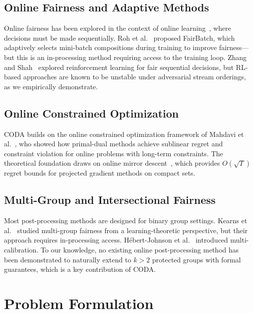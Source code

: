 \documentclass[10pt,twocolumn]{article}
\theoremstyle{definition}
\begin{document}
\subsection{Online Fairness and Adaptive Methods}
Online fairness has been explored in the context of online learning~\cite{gillen2018online,blum2018preserving}, where decisions must be made sequentially. Roh et al.~\cite{roh2021fairbatch} proposed FairBatch, which adaptively selects mini-batch compositions during training to improve fairness---but this is an in-processing method requiring access to the training loop. Zhang and Shah~\cite{zhang2020fairness} explored reinforcement learning for fair sequential decisions, but RL-based approaches are known to be unstable under adversarial stream orderings, as we empirically demonstrate.

\subsection{Online Constrained Optimization}
CODA builds on the online constrained optimization framework of Mahdavi et al.~\cite{mahdavi2012trading}, who showed how primal-dual methods achieve sublinear regret and constraint violation for online problems with long-term constraints. The theoretical foundation draws on online mirror descent~\cite{hazan2016introduction,shalev2012online}, which provides $O(\sqrt{T})$ regret bounds for projected gradient methods on compact sets.

\subsection{Multi-Group and Intersectional Fairness}
Most post-processing methods are designed for binary group settings. Kearns et al.~\cite{kearns2018preventing} studied multi-group fairness from a learning-theoretic perspective, but their approach requires in-processing access. H\'ebert-Johnson et al.~\cite{hebert2018multicalibration} introduced multi-calibration. To our knowledge, no existing online post-processing method has been demonstrated to naturally extend to $k > 2$ protected groups with formal guarantees, which is a key contribution of CODA.

\section{Problem Formulation}
\label{sec:problem}
\end{document}
